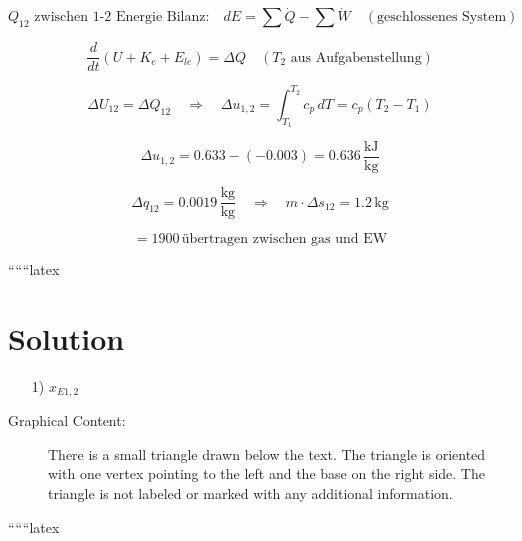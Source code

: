 \[
Q_{12} \text{ zwischen 1-2 Energie Bilanz:} \quad dE = \sum \dot{Q} - \sum \dot{W} \quad (\text{geschlossenes System})
\]

\[
\frac{d}{dt} (U + K_e + E_{le}) = \Delta Q \quad (T_2 \text{ aus Aufgabenstellung})
\]

\[
\Delta U_{12} = \Delta Q_{12} \quad \Rightarrow \quad \Delta u_{1,2} = \int_{T_1}^{T_2} c_{p} \, dT = c_{p} (T_2 - T_1)
\]

\[
\Delta u_{1,2} = 0.633 - (-0.003) = 0.636 \, \frac{\text{kJ}}{\text{kg}}
\]

\[
\Delta q_{12} = 0.0019 \, \frac{\text{kg}}{\text{kg}} \quad \Rightarrow \quad m \cdot \Delta s_{12} = 1.2 \, \text{kg}
\]

\[
= 1900 \, \text{übertragen zwischen gas und EW}
\]

``````latex


\section*{Solution}

\begin{itemize}
    \item[1)] \( x_{E1,2} \)
\end{itemize}

\begin{description}
    \item[Graphical Content:] 
    There is a small triangle drawn below the text. The triangle is oriented with one vertex pointing to the left and the base on the right side. The triangle is not labeled or marked with any additional information.
\end{description}

``````latex


